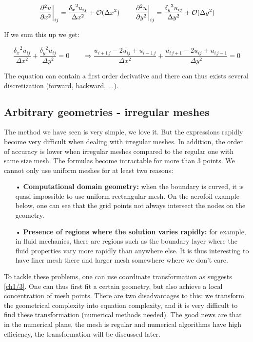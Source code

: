 \begin{equation}
\left. \frac{\partial^2 u}{\partial x^2} \right|_{ij} = \frac{{\delta_x} ^2u_{ij}}{\Delta x^2} + \mathcal{O}(\Delta x^2) \qquad \left. \frac{\partial^2 u}{\partial y^2} \right|_{ij} = \frac{{\delta _y} ^2u_{ij}}{\Delta y^2} + \mathcal{O}(\Delta y^2)
\end{equation}

If we sum this up we get: 

\begin{equation}
\frac{{\delta _x} ^2u_{ij}}{\Delta x^2} + \frac{{\delta _y} ^2u_{ij}}{\Delta y^2} = 0 \qquad \Rightarrow \frac{u_{i+1 \, j} - 2u_{ij} + u_{i-1\, j}}{\Delta x ^2} + \frac{u_{i \, j+1} - 2u_{ij} + u_{i\, j-1}}{\Delta y ^2} = 0
\end{equation}

The equation can contain a first order derivative and there can thus exists several discretization (forward, backward, ...). 

\subsection{Arbitrary geometries - irregular meshes}
The method we have seen is very simple, we love it. But the expressions rapidly become very difficult when dealing with irregular meshes. In addition, the order of accuracy is lower when irregular meshes compared to the regular one with same size mesh. The formulas become intractable for more than 3 points.  We cannot only use uniform meshes for at least two reasons: \\

\begin{itemize}
\item[•] \textbf{Computational domain geometry:} when the boundary is curved, it is quasi impossible to use uniform rectangular mesh. On the aerofoil example below, one can see that the grid points not always intersect the nodes on the geometry.  
\item[•] \textbf{Presence of regions where the solution varies rapidly:} for example, in fluid mechanics, there are regions such as the boundary layer where the fluid properties vary more rapidly than anywhere else. It is thus interesting to have finer mesh there and larger mesh somewhere where we don't care. 
\end{itemize}


To tackle these problems, one can use coordinate transformation as suggests \autoref{ch1/3}. One can thus first fit a certain geometry, but also achieve a local concentration of mesh points. There are two disadvantages to this: we transform the geometrical complexity into equation complexity, and it is very difficult to find these transformation (numerical methods needed). The good news are that in the numerical plane, the mesh is regular and numerical algorithms have high efficiency, the transformation will be discussed later.


